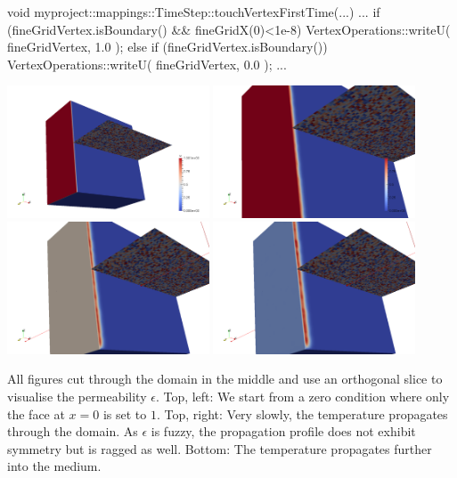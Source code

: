 \begin{code}
void myproject::mappings::TimeStep::touchVertexFirstTime(...) {
  ...
  if (fineGridVertex.isBoundary() && fineGridX(0)<1e-8) {
    VertexOperations::writeU( fineGridVertex, 1.0 );
  }
  else if (fineGridVertex.isBoundary()) {
    VertexOperations::writeU( fineGridVertex, 0.0 );
  }
  ...
}
\end{code}

\begin{center}
  \includegraphics[width=0.45\textwidth]{41_heat-equation/solution00.png}
  \includegraphics[width=0.45\textwidth]{41_heat-equation/solution01.png}
  \includegraphics[width=0.45\textwidth]{41_heat-equation/solution02.png}
  \includegraphics[width=0.45\textwidth]{41_heat-equation/solution03.png}
\end{center}


All figures cut through the domain in the middle and use an orthogonal slice to
visualise the permeability $\epsilon$.
Top, left: We start from a zero condition where only the face at $x=0$ is set to
$1$.
Top, right: Very slowly, the temperature propagates through the domain. As
$\epsilon $ is fuzzy, the propagation profile does not exhibit symmetry but is
ragged as well.
Bottom: The temperature propagates further into the medium.


